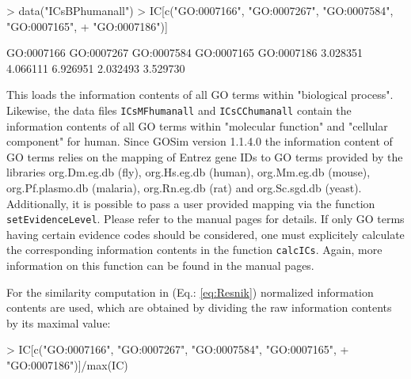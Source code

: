 \documentclass[12pt,a4paper]{article}
\begin{document}
\begin{Schunk}
\begin{Sinput}
> data("ICsBPhumanall")
> IC[c("GO:0007166", "GO:0007267", "GO:0007584", "GO:0007165", 
+     "GO:0007186")]
\end{Sinput}
\begin{Soutput}
GO:0007166 GO:0007267 GO:0007584 GO:0007165 GO:0007186 
  3.028351   4.066111   6.926951   2.032493   3.529730 
\end{Soutput}
\end{Schunk}
This loads the information contents of all GO terms within "biological process". Likewise, the data files {\tt ICsMFhumanall} and {\tt ICsCChumanall} contain the information contents of all GO terms within "molecular function" and "cellular component" for human. Since GOSim version 1.1.4.0 the information content of GO terms relies on the mapping of Entrez gene IDs to GO terms provided by the libraries org.Dm.eg.db (fly), org.Hs.eg.db (human), org.Mm.eg.db (mouse), org.Pf.plasmo.db (malaria), org.Rn.eg.db (rat) and org.Sc.sgd.db (yeast). Additionally, it is possible to pass a user provided mapping via the function {\tt setEvidenceLevel}. Please refer to the manual pages for details. If only GO terms having certain evidence codes should be considered, one must explicitely calculate the corresponding information contents in the function {\tt calcICs}. Again, more information on this function can be found in the manual pages.

For the similarity computation in (Eq.: \ref{eq:Resnik}) normalized information contents are used, which are obtained by dividing the raw information contents by its maximal value:
\begin{Schunk}
\begin{Sinput}
> IC[c("GO:0007166", "GO:0007267", "GO:0007584", "GO:0007165", 
+     "GO:0007186")]/max(IC)
\end{Sinput}
\end{Schunk}
\end{document}
